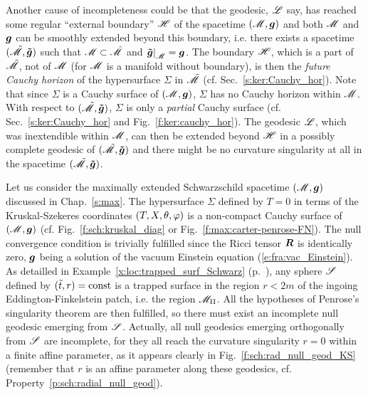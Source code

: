 Another cause of incompleteness could be
that the geodesic, $\mathscr{L}$ say, has reached some regular ``external boundary'' $\mathscr{H}$
of the spacetime $(\mathscr{M},\bm{g})$
and both $\mathscr{M}$ and $\bm{g}$ can be smoothly extended beyond this boundary, i.e.
there exists a spacetime $(\tilde{\mathscr{M}}, \bm{\tilde{g}})$ such that $\mathscr{M} \subset \tilde{\mathscr{M}}$
and $\left. \bm{\tilde{g}} \right| _{\mathscr{M}} = \bm{g}$. The boundary $\mathscr{H}$, which is a part of
$\tilde{\mathscr{M}}$, not of $\mathscr{M}$ (for $\mathscr{M}$ is a manifold without boundary), is then the
\emph{future Cauchy horizon}  of the hypersurface $\Sigma$
in $\tilde{\mathscr{M}}$ (cf. Sec.~\ref{s:ker:Cauchy_hor}).
Note that since $\Sigma$ is a Cauchy surface of $(\mathscr{M},\bm{g})$,
$\Sigma$ has no Cauchy horizon within $\mathscr{M}$. With respect to $(\tilde{\mathscr{M}}, \bm{\tilde{g}})$,
$\Sigma$ is only a \emph{partial} Cauchy surface (cf. Sec.~\ref{s:ker:Cauchy_hor}
and Fig.~\ref{f:ker:cauchy_hor}).
The geodesic $\mathscr{L}$, which was inextendible within $\mathscr{M}$, can then be extended beyond
$\mathscr{H}$ in a possibly complete geodesic of $(\tilde{\mathscr{M}},\bm{\tilde{g}})$ and
there might be no curvature singularity at all in the spacetime $(\tilde{\mathscr{M}},\bm{\tilde{g}})$.

\begin{example}
\label{x:loc:Penrose_thm_Schwarz}
Let us consider the maximally extended Schwarzschild spacetime $(\mathscr{M},\bm{g})$
discussed in Chap.~\ref{s:max}.
The hypersurface $\Sigma$ defined by $T=0$ in terms of the Kruskal-Szekeres coordinates
$(T,X,\theta,\varphi)$ is a non-compact Cauchy surface of $(\mathscr{M},\bm{g})$ (cf. Fig.~\ref{f:sch:kruskal_diag}
or Fig.~\ref{f:max:carter-penrose-FN}).
The null convergence condition
is trivially fulfilled since the Ricci tensor $\bm{R}$
is identically zero, $\bm{g}$ being a solution of the vacuum Einstein equation
(\ref{e:fra:vac_Einstein}). As detailled in Example~\ref{x:loc:trapped_surf_Schwarz}
(p.~\pageref{x:loc:trapped_surf_Schwarz}), any sphere $\mathscr{S}$ defined
by $({\tilde t},r) = \mathrm{const}$ is a trapped surface in the region $r<2 m$
of the ingoing Eddington-Finkelstein patch, i.e. the region $\mathscr{M}_{\rm II}$.
All the hypotheses of Penrose's singularity theorem are then fulfilled,
so there must exist an incomplete null geodesic emerging from $\mathscr{S}$.
Actually, all null geodesics emerging orthogonally from $\mathscr{S}$ are incomplete,
for they all reach the curvature singularity $r=0$ within a finite affine
parameter, as it appears clearly in Fig.~\ref{f:sch:rad_null_geod_KS}
(remember that $r$ is an affine parameter along these geodesics, cf.
Property~\ref{p:sch:radial_null_geod}).
\end{example}


